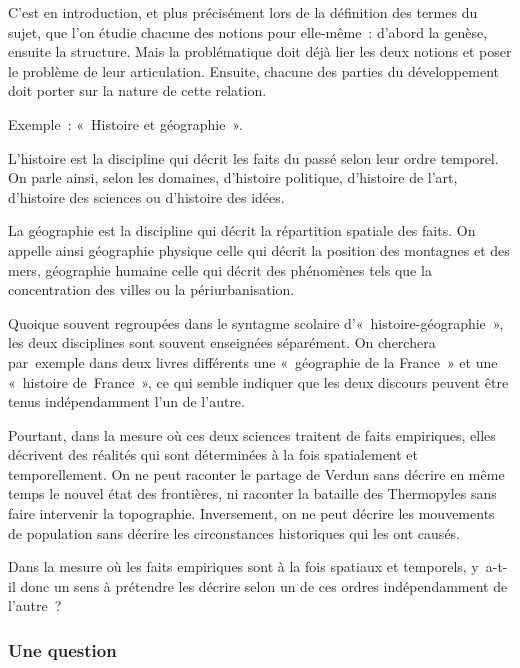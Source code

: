\documentclass[a4paper,12pt]{article}
\begin{document}
C'est en introduction, et plus précisément lors de la définition des
termes du sujet, que l'on étudie chacune des notions pour elle-même :
d'abord la genèse, ensuite la structure. Mais la problématique doit déjà
lier les deux notions et poser le problème de leur articulation.
Ensuite, chacune des parties du développement doit porter sur la nature
de cette relation.

Exemple : « Histoire et géographie ».
\begin{QUOTATION}
L'histoire est la discipline qui décrit les faits
du passé selon leur ordre temporel. On parle ainsi, selon les domaines,
d'histoire politique, d'histoire de l'art, d'histoire des sciences ou
d'histoire des idées.

La géographie est la discipline qui décrit la répartition spatiale des
faits. On appelle ainsi géographie physique celle qui décrit la position
des montagnes et des mers, géographie humaine celle qui décrit des
phénomènes tels que la concentration des villes ou la périurbanisation.

Quoique souvent regroupées dans le syntagme
scolaire d'« his\-toire-géographie », les deux disciplines sont souvent
enseignées séparément. On cherchera par exemple dans deux livres
différents une « géographie de la France » et une « histoire
de France », ce qui semble indiquer que les deux discours peuvent être
tenus indépendamment l'un de l'autre.

Pourtant, dans la mesure où ces deux sciences
traitent de faits empiriques, elles décrivent des réalités qui sont
déterminées à la fois spatialement et temporellement. On ne peut
raconter le partage de Verdun sans décrire en même temps le nouvel état
des frontières, ni raconter la bataille des Thermopyles sans faire
intervenir la topographie. Inversement, on ne peut décrire les
mouvements de population sans décrire les circonstances historiques qui
les ont causés.

Dans la mesure où les faits empiriques sont à
la fois spatiaux et temporels, y a-t-il donc un sens à prétendre les
décrire selon un de ces ordres indépendamment de l'autre ?
\end{QUOTATION}

\subsubsection{Une question}
\label{sec:orgb87b2ca}
\end{document}
